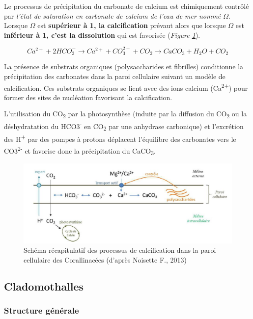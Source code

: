 \documentclass[
]{book}
\begin{document}
Le processus de précipitation du carbonate de calcium est chimiquement contrôlé par \emph{l'état de saturation en carbonate de calcium de l'eau de mer nommé \(\Omega\)}. Lorsque \(\Omega\) est \textbf{supérieur à 1, la calcification} prévaut alors que lorsque \(\Omega\) est \textbf{inférieur à 1, c'est la dissolution} qui est favorisée (\emph{Figure \ref{fig:calcification}}).

\[Ca^{2+} + 2HCO_3^- \rightarrow Ca^{2+} + CO_3^{2-}+CO_2 \rightarrow CaCO_3+H_2O+CO_2\]

La présence de substrats organiques (polysaccharides et fibrilles) conditionne la précipitation des carbonates dans la paroi
cellulaire suivant un modèle de calcification. Ces substrats organiques se lient avec des ions calcium (Ca\textsuperscript{2+}) pour former des sites de nucléation favorisant la calcification.

L'utilisation du CO\textsubscript{2} par la photosynthèse (induite par la diffusion du CO\textsubscript{2} ou la déshydratation du HCO3\textsuperscript{-} en CO\textsubscript{2} par une anhydrase carbonique) et l'excrétion des H\textsuperscript{+} par des pompes à protons déplacent l'équilibre des carbonates vers le
CO3\textsuperscript{2-} et favorise donc la précipitation du CaCO\textsubscript{3}.

\begin{figure}[H]

{\centering \includegraphics[width=0.7\linewidth]{./images/calcification} 

}

\caption{Schéma récapitulatif des processus de calcification dans la paroi cellulaire des Corallinacées (d'après Noisette F., 2013)}\label{fig:calcification}
\end{figure}

\hypertarget{cladomothalles}{%
\subsection{Cladomothalles}\label{cladomothalles}}

\hypertarget{structure-guxe9nuxe9rale}{%
\subsubsection{Structure générale}\label{structure-guxe9nuxe9rale}}
\end{document}
